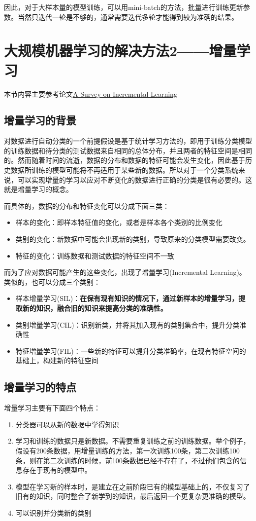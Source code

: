 \documentclass{article}
\begin{document}
	因此，对于大样本量的模型训练，可以用mini-batch的方法，批量进行训练更新参数。当然只迭代一轮是不够的，通常需要迭代多轮才能得到较为准确的结果。

\section{大规模机器学习的解决方法2——增量学习}
本节内容主要参考论文\href{https://www.webofproceedings.org/proceedings_series/ECS/CAPE%202017/CAPE_1113034.pdf}{A Survey on Incremental Learning}
	\subsection{增量学习的背景}
	对数据进行自动分类的一个前提假设是基于统计学习方法的，即用于训练分类模型的训练数据和待分类的测试数据来自相同的总体分布，并且两者的特征空间是相同的。然而随着时间的流逝，数据的分布和数据的特征可能会发生变化，因此基于历史数据所训练的模型可能将不再适用于某些新的数据。所以对于一个分类系统来说，可以实现增量的学习以应对不断变化的数据进行正确的分类是很有必要的。这就是增量学习的概念。

	而具体的，数据的分布和特征变化可以分成下面三类：
	\begin{itemize}
		\item 样本的变化：即样本特征值的变化，或者是样本各个类别的比例变化
		\item 类别的变化：新数据中可能会出现新的类别，导致原来的分类模型需要改变。
		\item 特征的变化：训练数据和测试数据的特征空间不一致
	\end{itemize}
	而为了应对数据可能产生的这些变化，出现了增量学习(Incremental Learning)。类似的，也可以分成三个类别：
	\begin{itemize}
		\item 样本增量学习(SIL)：\textbf{在保有现有知识的情况下，通过新样本的增量学习，提取新的知识，融合旧的知识来提高分类的准确性。}
		\item 类别增量学习(CIL)：识别新类，并将其加入现有的类别集合中，提升分类准确性
		\item 特征增量学习(FIL)：一些新的特征可以提升分类准确率，在现有特征空间的基础上，构建新的特征空间
	\end{itemize}

	\subsection{增量学习的特点}
	增量学习主要有下面四个特点：
	\begin{enumerate}
		\item 分类器可以从新的数据中学得知识
		\item 学习和训练的数据只是新数据。不需要重复训练之前的训练数据。举个例子，假设有200条数据，用增量训练的方法，第一次训练100条，第二次训练100条，则在第二次训练的时候，前100条数据已经不存在了，不过他们包含的信息存在于现有的模型中。
		\item 模型在学习新的样本时，是建立在之前阶段已有的模型基础上的，不仅复习了旧有的知识，同时整合了新学到的知识，最后返回一个更复杂更准确的模型。
		\item 可以识别并分类新的类别
	\end{enumerate}
\end{document}
